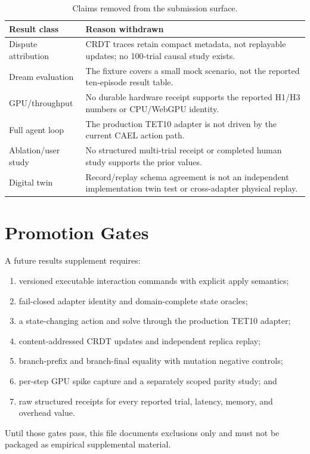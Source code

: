 \documentclass[sigconf,nonacm]{acmart}
\begin{document}
\begin{table}[h]
\caption{Claims removed from the submission surface.}
\small
\begin{tabular}{@{}lp{}@{}}
\toprule
\textbf{Result class} & \textbf{Reason withdrawn} \\
\midrule
Dispute attribution & CRDT traces retain compact metadata, not replayable
updates; no 100-trial causal study exists. \\
Dream evaluation & The fixture covers a small mock scenario, not the reported
ten-episode result table. \\
GPU/throughput & No durable hardware receipt supports the reported H1/H3
numbers or CPU/WebGPU identity. \\
Full agent loop & The production TET10 adapter is not driven by the current
CAEL action path. \\
Ablation/user study & No structured multi-trial receipt or completed human
study supports the prior values. \\
Digital twin & Record/replay schema agreement is not an independent
implementation twin test or cross-adapter physical replay. \\
\bottomrule
\end{tabular}
\end{table}

\section{Promotion Gates}

A future results supplement requires:
\begin{enumerate}
  \item versioned executable interaction commands with explicit apply
        semantics;
  \item fail-closed adapter identity and domain-complete state oracles;
  \item a state-changing action and solve through the production TET10
        adapter;
  \item content-addressed CRDT updates and independent replica replay;
  \item branch-prefix and branch-final equality with mutation negative
        controls;
  \item per-step GPU spike capture and a separately scoped parity study; and
  \item raw structured receipts for every reported trial, latency, memory, and
        overhead value.
\end{enumerate}

Until those gates pass, this file documents exclusions only and must not be
packaged as empirical supplemental material.
\end{document}
